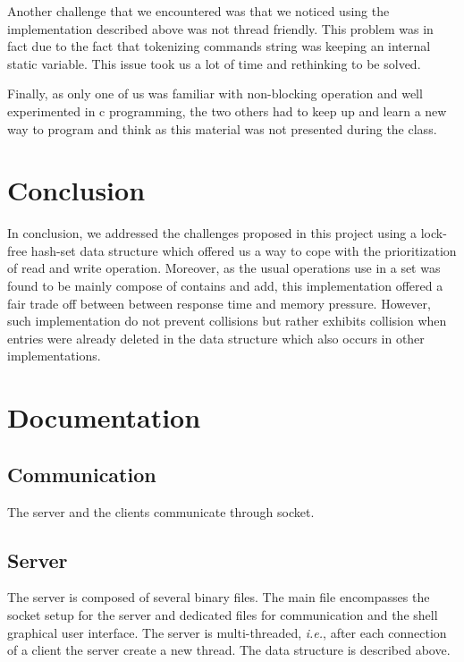 \documentclass[a4paper,11pt]{report}
\begin{document}
    Another challenge that we encountered was that we noticed using the implementation described above was not
    thread friendly.
    This problem was in fact due to the fact that tokenizing commands string was keeping an internal static variable.
    This issue took us a lot of time and rethinking to be solved.

    Finally, as only one of us was familiar with non-blocking operation and well experimented in c programming,
    the two others had to keep up and learn a new way to program and think as this material was not presented
    during the class.

    \section*{Conclusion}
    In conclusion, we addressed the challenges proposed in this project using a lock-free hash-set data structure which
    offered us a way to cope with the prioritization of read and write operation. Moreover, as the usual operations use
    in a set was found to be mainly compose of contains and add, this implementation offered a fair trade off between
    between response time and memory pressure. However, such implementation do not prevent collisions but rather
    exhibits collision when entries were already deleted in the data structure which also occurs in other implementations.


    \printbibliography

    \newpage

    \section*{Documentation}

    \subsection*{Communication}
    The server and the clients communicate through socket.

    \subsection*{Server}
    The server is composed of several binary files.
    The main file encompasses the socket setup for the server and dedicated files for communication and the shell
    graphical user interface.
    The server is multi-threaded, \textit{i.e.}, after each connection of a client the server create a new thread.
    The data structure is described above.
\end{document}
